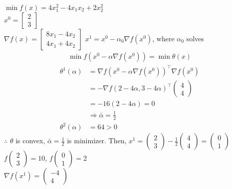 \documentclass[11pt]{article}
\numberwithin{equation}{section}
\begin{document}
\begin{example}
    $\min f(x)=4 x_{1}^{2}-4 x_{1} x_{2}+2 x_{2}^{2}$\\
    $x^0=\left[\begin{array}{c}2 \\ 3\end{array}\right]$\\
    $\nabla f(x)=\left[\begin{array}{c}8 x_{1}-4 x_{2} \\ 4 x_{1}+4 x_{2}\end{array}\right]$
    $x^1 = x^0 - \alpha_0 \nabla f(x^0)$, where $\alpha_0$ solves \begin{align*}
        \min f(x^0 - \alpha \nabla f(x^0)) = \min \theta(x)
    \end{align*}
    \begin{align*}
        \theta^1 (\alpha) &= \nabla f(x^0 - \alpha \nabla f(x^0))^\top \nabla f(x^0) \\
        &= -\nabla f(2-4\alpha, 3-4\alpha)^\top \left(\begin{array}{c}4 \\ 4\end{array}\right) \\
        &= -16 (2-4\alpha) = 0 \\
        &\Rightarrow \bar{\alpha} = \frac{1}{2} \\
        \theta^2 (\alpha) &= 64 > 0
    \end{align*}
    $\therefore$ $\theta$ is convex, $\bar{\alpha} = \frac{1}{2}$ is minimizer. Then, $x^{1}=\left(\begin{array}{l}2 \\ 3\end{array}\right)-\frac{1}{2}\left(\begin{array}{l}4 \\ 4\end{array}\right)=\left(\begin{array}{l}0 \\ 1\end{array}\right)$\\
    $f\left(\begin{array}{l}2 \\ 3\end{array}\right)=10$, $f\left(\begin{array}{l}0 \\ 1\end{array}\right)=2$ \\
    $\nabla f(x^1)=\left(\begin{array}{l}-4 \\ 4\end{array}\right)$\\

\end{example}
\end{document}
